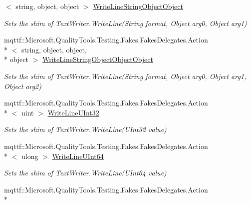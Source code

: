 \begin{DoxyCompactItemize}
$<$ string, object, object $>$ \hyperlink{class_system_1_1_i_o_1_1_fakes_1_1_shim_text_writer_a6feb51fb3a382882016e29086e3f95c6}{Write\-Line\-String\-Object\-Object}
\begin{DoxyCompactList}\small\item\em Sets the shim of Text\-Writer.\-Write\-Line(\-String format, Object arg0, Object arg1)\end{DoxyCompactList}\item 
mqttf\-::\-Microsoft.\-Quality\-Tools.\-Testing.\-Fakes.\-Fakes\-Delegates.\-Action\\*
$<$ string, object, object, \\*
object $>$ \hyperlink{class_system_1_1_i_o_1_1_fakes_1_1_shim_text_writer_a8bb3ba14c755a7655f529b7bbeb0e0d0}{Write\-Line\-String\-Object\-Object\-Object}
\begin{DoxyCompactList}\small\item\em Sets the shim of Text\-Writer.\-Write\-Line(\-String format, Object arg0, Object arg1, Object arg2)\end{DoxyCompactList}\item 
mqttf\-::\-Microsoft.\-Quality\-Tools.\-Testing.\-Fakes.\-Fakes\-Delegates.\-Action\\*
$<$ uint $>$ \hyperlink{class_system_1_1_i_o_1_1_fakes_1_1_shim_text_writer_a5ed3dcc4431e7c36aa1dbbda9ec0fb79}{Write\-Line\-U\-Int32}
\begin{DoxyCompactList}\small\item\em Sets the shim of Text\-Writer.\-Write\-Line(\-U\-Int32 value)\end{DoxyCompactList}\item 
mqttf\-::\-Microsoft.\-Quality\-Tools.\-Testing.\-Fakes.\-Fakes\-Delegates.\-Action\\*
$<$ ulong $>$ \hyperlink{class_system_1_1_i_o_1_1_fakes_1_1_shim_text_writer_a57ae6aa734ee4a3b42e89c366adb8fda}{Write\-Line\-U\-Int64}
\begin{DoxyCompactList}\small\item\em Sets the shim of Text\-Writer.\-Write\-Line(\-U\-Int64 value)\end{DoxyCompactList}\item 
mqttf\-::\-Microsoft.\-Quality\-Tools.\-Testing.\-Fakes.\-Fakes\-Delegates.\-Action\\*

\end{DoxyCompactItemize}
